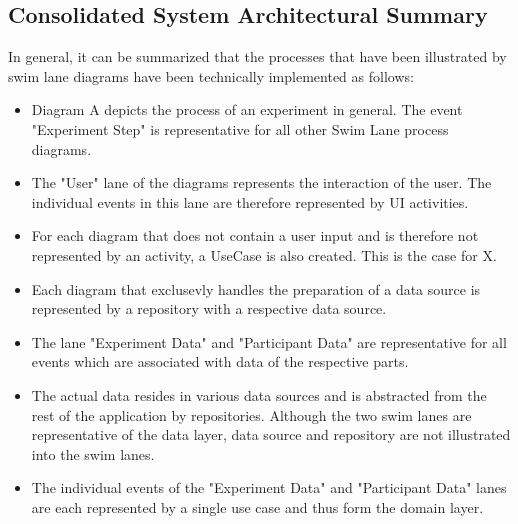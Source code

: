 \subsection{Consolidated System Architectural Summary}\label{subsec:completeArchitecture}

In general, it can be summarized that the processes that have been illustrated by swim lane diagrams have been technically implemented as follows:
\begin{itemize}
    \item Diagram A depicts the process of an experiment in general. The event "Experiment Step" is representative for all other Swim Lane process diagrams.
    \item The "User" lane of the diagrams represents the interaction of the user. The individual events in this lane are therefore represented by UI activities.
    \item For each diagram that does not contain a user input and is therefore not represented by an activity, a UseCase is also created. This is the case for X.
    \item Each diagram that exclusevly handles the preparation of a data source is represented by a repository with a respective data source.
    \item The lane "Experiment Data" and "Participant Data" are representative for all events which are associated with data of the respective parts. 
    \item The actual data resides in various data sources and is abstracted from the rest of the application by repositories. Although the two swim lanes are representative of the data layer, data source and repository are not illustrated into the swim lanes.
    \item The individual events of the "Experiment Data" and "Participant Data" lanes are each represented by a single use case and thus form the domain layer.
\end{itemize}





